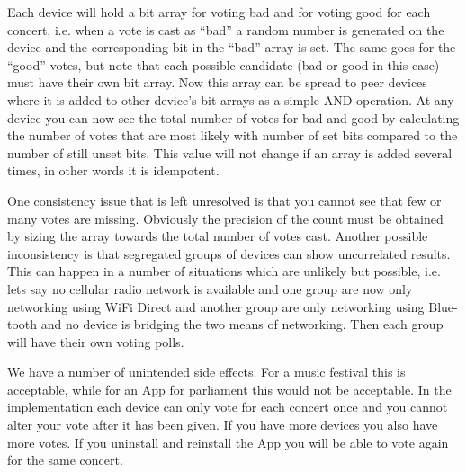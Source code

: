 Each device will hold a bit array for voting bad and for voting good for each concert, i.e. when a vote is cast as ``bad'' a random number is generated on the device and the corresponding bit in the ``bad'' array is set. The same goes for the ``good'' votes, but note that each possible candidate (bad or good in this case) must have their own bit array. Now this array can be spread to peer devices where it is added to other device\textquoteright s bit arrays as a simple AND operation. At any device you can now see the total number of votes for bad and good by calculating the number of votes that are most likely with number of set bits compared to the number of still unset bits. This value will not change if an array is added several times, in other words it is idempotent. 

One consistency issue that is left unresolved is that you cannot see that few or many votes are missing. Obviously the precision of the count must be obtained by sizing the array towards the total number of votes cast. Another possible inconsistency is that segregated groups of devices can show uncorrelated results. This can happen in a number of situations which are unlikely but possible, i.e. lets say no cellular radio network is available and one group are now only networking using WiFi Direct and another group are only networking using Blue-tooth and no device is bridging the two means of networking. Then each group will have their own voting polls.

We have a number of unintended side effects. For a music festival this is acceptable, while for an App for parliament this would not be acceptable. In the implementation each device can only vote for each concert once and you cannot alter your vote after it has been given. If you have more devices you also have more votes. If you uninstall and reinstall the App you will be able to vote again for the same concert.

